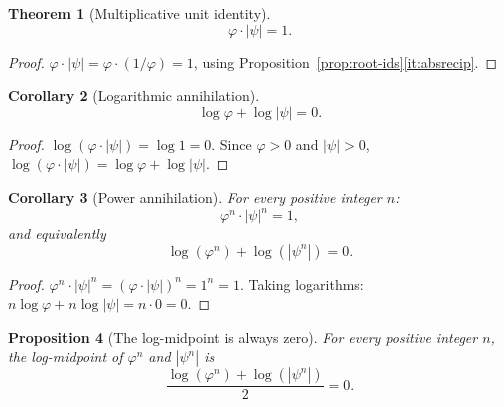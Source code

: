 \documentclass[12pt, a4paper]{article}
\theoremstyle{plain}
\newtheorem{theorem}{Theorem}[section]
\newtheorem{proposition}[theorem]{Proposition}
\newtheorem{corollary}[theorem]{Corollary}
\theoremstyle{definition}
\theoremstyle{remark}
\newcommand{\vp}{\varphi}
\begin{document}
\begin{theorem}[Multiplicative unit identity]\label{thm:unit}
  \begin{equation}\label{eq:unit}
    \vp \cdot |\psi| = 1.
  \end{equation}
\end{theorem}

\begin{proof}
  $\vp \cdot |\psi| = \vp \cdot (1/\vp) = 1$,
  using Proposition~\ref{prop:root-ids}\ref{it:absrecip}.
\end{proof}

\begin{corollary}[Logarithmic annihilation]\label{cor:log-zero}
  \begin{equation}\label{eq:log-zero}
    \log \vp + \log |\psi| = 0.
  \end{equation}
\end{corollary}

\begin{proof}
  $\log(\vp \cdot |\psi|) = \log 1 = 0$.
  Since $\vp > 0$ and $|\psi| > 0$,
  $\log(\vp \cdot |\psi|) = \log \vp + \log |\psi|$.
\end{proof}

\begin{corollary}[Power annihilation]\label{cor:power-zero}
  For every positive integer $n$:
  \begin{equation}\label{eq:power-zero}
    \vp^n \cdot |\psi|^n = 1,
  \end{equation}
  and equivalently
  \begin{equation}\label{eq:log-power-zero}
    \log(\vp^n) + \log(|\psi^n|) = 0.
  \end{equation}
\end{corollary}

\begin{proof}
  $\vp^n \cdot |\psi|^n = (\vp \cdot |\psi|)^n = 1^n = 1$.
  Taking logarithms: $n \log \vp + n \log |\psi| = n \cdot 0 = 0$.
\end{proof}

\begin{proposition}[The log-midpoint is always zero]\label{prop:midpoint-log}
  For every positive integer $n$, the log-midpoint of $\vp^n$ and
  $|\psi^n|$ is
  \begin{equation}\label{eq:midpoint-log}
    \frac{\log(\vp^n) + \log(|\psi^n|)}{2} = 0.
  \end{equation}
\end{proposition}
\end{document}
